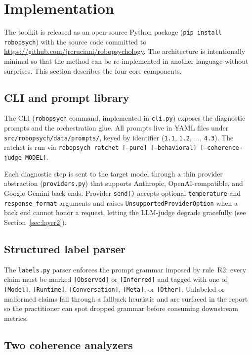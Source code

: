 \section{Implementation}
\label{sec:implementation}

The toolkit is released as an open-source Python package
(\texttt{pip install robopsych}) with the source code committed to
\url{https://github.com/jrcruciani/robopsychology}. The architecture
is intentionally minimal so that the method can be re-implemented in
another language without surprises. This section describes the four
core components.

\subsection{CLI and prompt library}

The CLI (\texttt{robopsych} command, implemented in \texttt{cli.py})
exposes the diagnostic prompts and the orchestration glue. All prompts
live in YAML files under \texttt{src/robopsych/data/prompts/}, keyed
by identifier (\texttt{1.1}, \texttt{1.2}, ..., \texttt{4.3}). The
ratchet is run via \texttt{robopsych ratchet [--pure] [--behavioral]
[--coherence-judge MODEL]}.

Each diagnostic step is sent to the target model through a thin
provider abstraction (\texttt{providers.py}) that supports
Anthropic, OpenAI-compatible, and Google Gemini back ends. Provider
\texttt{send()} accepts optional \texttt{temperature} and
\texttt{response\_format} arguments and raises
\texttt{UnsupportedProviderOption} when a back end cannot honor a
request, letting the LLM-judge degrade gracefully (see
Section~\ref{sec:layer2}).

\subsection{Structured label parser}

The \texttt{labels.py} parser enforces the prompt grammar imposed by
rule~R2: every claim must be marked \texttt{[Observed]} or
\texttt{[Inferred]} and tagged with one of \texttt{[Model]},
\texttt{[Runtime]}, \texttt{[Conversation]}, \texttt{[Meta]}, or
\texttt{[Other]}. Unlabeled or malformed claims fall through a
fallback heuristic and are surfaced in the report so the practitioner
can spot dropped grammar before consuming downstream metrics.

\subsection{Two coherence analyzers}

